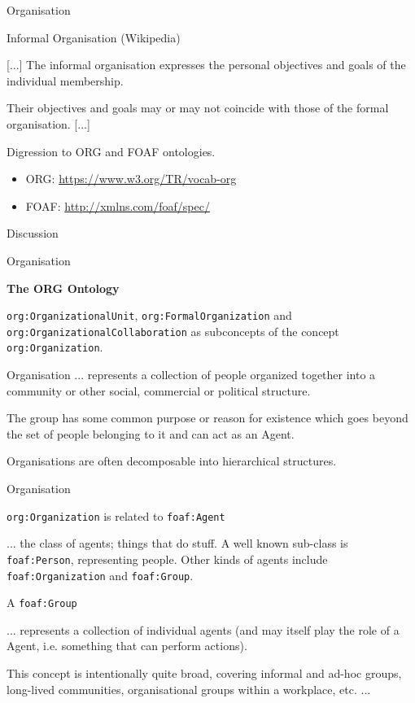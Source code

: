 \documentclass{beamer}
\newcommand{\ueberschrift}[1]{\begin{center}\bf #1\end{center}}
\begin{document}
\begin{frame}{Organisation}
  \begin{block}{Informal Organisation (Wikipedia)}
   
    [...] The informal organisation expresses the personal objectives and
    goals of the individual membership.

    Their objectives and goals may or may not coincide with those of the
    formal organisation. [...]
  \end{block}

  Digression to ORG and FOAF ontologies.
  \begin{itemize}
  \item ORG: \url{https://www.w3.org/TR/vocab-org}
  \item FOAF: \url{http://xmlns.com/foaf/spec/}
  \end{itemize}

  \begin{center}\Large Discussion  \end{center}
  
\end{frame}

\begin{frame}{Organisation}

  \ueberschrift{The ORG Ontology}

  \texttt{org:OrganizationalUnit}, \texttt{org:FormalOrganization} and
  \texttt{org:OrganizationalCollaboration} as subconcepts of the concept
  \texttt{org:Organization}.

  \begin{block}{Organisation}
    ... represents a collection of people organized together into a community
    or other social, commercial or political structure.\medskip

    The group has some common purpose or reason for existence which goes
    beyond the set of people belonging to it and can act as an Agent.\medskip

    Organisations are often decomposable into hierarchical structures.
  \end{block}
\end{frame}

\begin{frame}{Organisation}

  \texttt{org:Organization} is related to \texttt{foaf:Agent}

  ... the class of agents; things that do stuff. A well known sub-class is
  \texttt{foaf:Person}, representing people. Other kinds of agents include
  \texttt{foaf:Organization} and \texttt{foaf:Group}. 

  A \texttt{foaf:Group}

  ... represents a collection of individual agents (and may itself play the
  role of a Agent, i.e. something that can perform actions).

  This concept is intentionally quite broad, covering informal and ad-hoc
  groups, long-lived communities, organisational groups within a workplace,
  etc. ...
\end{frame}
\end{document}

